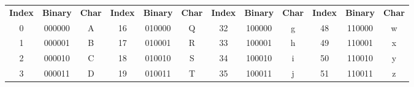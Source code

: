 \documentclass[a4paper,11pt]{article}
\begin{document}
\begin{table}[h]
	\begin{tabular}{ccc|ccc|ccc|ccc}
		\rowcolor[HTML]{EAECF0}
		{\color[HTML]{202122} \textbf{Index}} & {\color[HTML]{202122} \textbf{Binary}} & {\color[HTML]{202122} \textbf{Char}} & {\color[HTML]{202122} \textbf{Index}} & {\color[HTML]{202122} \textbf{Binary}} & {\color[HTML]{202122} \textbf{Char}} & {\color[HTML]{202122} \textbf{Index}} & {\color[HTML]{202122} \textbf{Binary}} & {\color[HTML]{202122} \textbf{Char}} & {\color[HTML]{202122} \textbf{Index}} & {\color[HTML]{202122} \textbf{Binary}} & {\color[HTML]{202122} \textbf{Char}} \\
		\rowcolor[HTML]{F8F9FA}
		{\color[HTML]{202122} 0}              & {\color[HTML]{202122} 000000}          & {\color[HTML]{202122} A}             & {\color[HTML]{202122} 16}             & {\color[HTML]{202122} 010000}          & {\color[HTML]{202122} Q}             & {\color[HTML]{202122} 32}             & {\color[HTML]{202122} 100000}          & {\color[HTML]{202122} g}             & {\color[HTML]{202122} 48}             & {\color[HTML]{202122} 110000}          & {\color[HTML]{202122} w}             \\
		\rowcolor[HTML]{F8F9FA}
		{\color[HTML]{202122} 1}              & {\color[HTML]{202122} 000001}          & {\color[HTML]{202122} B}             & {\color[HTML]{202122} 17}             & {\color[HTML]{202122} 010001}          & {\color[HTML]{202122} R}             & {\color[HTML]{202122} 33}             & {\color[HTML]{202122} 100001}          & {\color[HTML]{202122} h}             & {\color[HTML]{202122} 49}             & {\color[HTML]{202122} 110001}          & {\color[HTML]{202122} x}             \\
		\rowcolor[HTML]{F8F9FA}
		{\color[HTML]{202122} 2}              & {\color[HTML]{202122} 000010}          & {\color[HTML]{202122} C}             & {\color[HTML]{202122} 18}             & {\color[HTML]{202122} 010010}          & {\color[HTML]{202122} S}             & {\color[HTML]{202122} 34}             & {\color[HTML]{202122} 100010}          & {\color[HTML]{202122} i}             & {\color[HTML]{202122} 50}             & {\color[HTML]{202122} 110010}          & {\color[HTML]{202122} y}             \\
		\rowcolor[HTML]{F8F9FA}
		{\color[HTML]{202122} 3}              & {\color[HTML]{202122} 000011}          & {\color[HTML]{202122} D}             & {\color[HTML]{202122} 19}             & {\color[HTML]{202122} 010011}          & {\color[HTML]{202122} T}             & {\color[HTML]{202122} 35}             & {\color[HTML]{202122} 100011}          & {\color[HTML]{202122} j}             & {\color[HTML]{202122} 51}             & {\color[HTML]{202122} 110011}          & {\color[HTML]{202122} z}             \\

\end{tabular}
\end{table}
\end{document}
